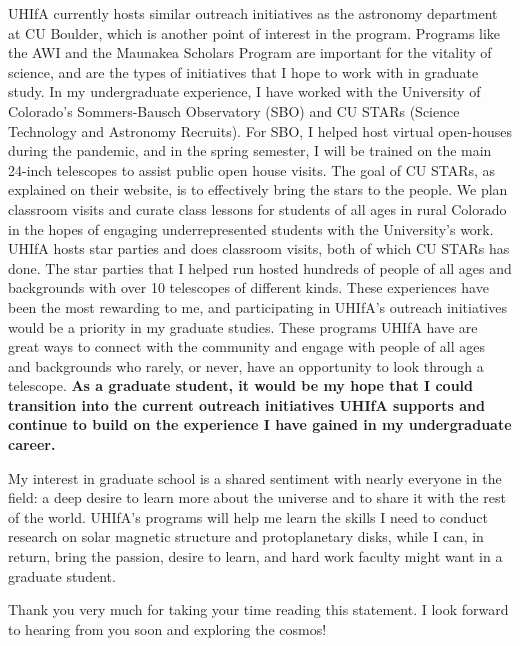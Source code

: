 \documentclass[11pt,letterpaper]{article}
\begin{document}
UHIfA currently hosts similar outreach initiatives as the astronomy department at CU Boulder, which is another point of interest in the program. Programs like the AWI and the Maunakea Scholars Program are important for the vitality of science, and are the types of initiatives that I hope to work with in graduate study. In my undergraduate experience, I have worked with the University of Colorado’s Sommers-Bausch Observatory (SBO) and CU STARs (Science Technology and Astronomy Recruits). For SBO, I helped host virtual open-houses during the pandemic, and in the spring semester, I will be trained on the main 24-inch telescopes to assist public open house visits. The goal of CU STARs, as explained on their website, is to effectively bring the stars to the people. We plan classroom visits and curate class lessons for students of all ages in rural Colorado in the hopes of engaging underrepresented students with the University's work. UHIfA hosts star parties and does classroom visits, both of which CU STARs has done. The star parties that I helped run hosted hundreds of people of all ages and backgrounds with over 10 telescopes of different kinds. These experiences have been the most rewarding to me, and participating in UHIfA's outreach initiatives would be a priority in my graduate studies. These programs UHIfA have are great ways to connect with the community and engage with people of all ages and backgrounds who rarely, or never, have an opportunity to look through a telescope. \textbf{As a graduate student, it would be my hope that I could transition into the current outreach initiatives UHIfA supports and continue to build on the experience I have gained in my undergraduate career.}

My interest in graduate school is a shared sentiment with nearly everyone in the field: a deep desire to learn more about the universe and to share it with the rest of the world. UHIfA’s programs will help me learn the skills I need to conduct research on solar magnetic structure and protoplanetary disks, while I can, in return, bring the passion, desire to learn, and hard work faculty might want in a graduate student.

Thank you very much for taking your time reading this statement. I look forward to hearing from you soon and exploring the cosmos!
\end{document}
